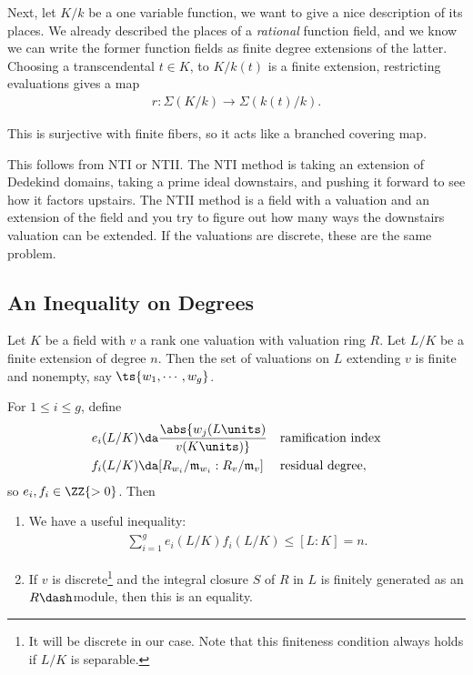 Next, let \(K/k\) be a one variable function, we want to give a nice
description of its places. We already described the places of a
\emph{rational} function field, and we know we can write the former
function fields as finite degree extensions of the latter. Choosing a
transcendental \(t\in K\), to \(K/k(t)\) is a finite extension,
restricting evaluations gives a map
\begin{align*}  
r: \Sigma(K/k) \to \Sigma(k(t)/ k)
.\end{align*}

\begin{claim}

This is surjective with finite fibers, so it acts like a branched
covering map.

\end{claim}

This follows from NTI or NTII. The NTI method is taking an extension of
Dedekind domains, taking a prime ideal downstairs, and pushing it
forward to see how it factors upstairs. The NTII method is a field with
a valuation and an extension of the field and you try to figure out how
many ways the downstairs valuation can be extended. If the valuations
are discrete, these are the same problem.

\hypertarget{an-inequality-on-degrees}{%
\subsection{An Inequality on Degrees}\label{an-inequality-on-degrees}}

\begin{theorem}

Let \(K\) be a field with \(v\) a rank one valuation with valuation ring
\(R\). Let \(L/K\) be a finite extension of degree \(n\). Then the set
of valuations on \(L\) extending \(v\) is finite and nonempty, say
\(\ts{w_1, \cdots, w_g}\).

For \(1\leq i \leq g\), define
\begin{align*}  
e_i(L/K) &\da \abs{ w_j (L\units) \over v(K\units) }  && \text{ramification index} \\
f_i(L/K) &\da [R_{w_i}/\mathfrak{m}_{w_i} : R_v/ \mathfrak{m}_v] && \text{residual degree}
,\end{align*} so \(e_i, f_i \in \ZZ{>0}\). Then

\begin{enumerate}
\def\labelenumi{\alph{enumi}.}
\item
  We have a useful inequality:
  \begin{align*}  
  \sum_{i=1}^g e_i(L/K) f_i(L/K) \leq [L: K] = n
  .\end{align*}
\item
  If \(v\) is discrete\footnote{It will be discrete in our case. Note
    that this finiteness condition always holds if \(L/K\) is separable.}
  and the integral closure \(S\) of \(R\) in \(L\) is finitely generated
  as an \(R\dash\)module, then this is an equality.
\end{enumerate}

\end{theorem}

